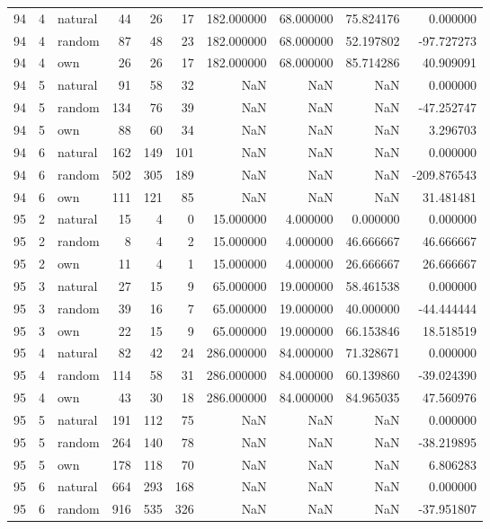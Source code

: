 \begin{table}[htbp]
\begin{tabular}{rrlrrrrrrr}
94 & 4 & natural & 44 & 26 & 17 & 182.000000 & 68.000000 & 75.824176 & 0.000000 \\
94 & 4 & random & 87 & 48 & 23 & 182.000000 & 68.000000 & 52.197802 & -97.727273 \\
94 & 4 & own & 26 & 26 & 17 & 182.000000 & 68.000000 & 85.714286 & 40.909091 \\
94 & 5 & natural & 91 & 58 & 32 & NaN & NaN & NaN & 0.000000 \\
94 & 5 & random & 134 & 76 & 39 & NaN & NaN & NaN & -47.252747 \\
94 & 5 & own & 88 & 60 & 34 & NaN & NaN & NaN & 3.296703 \\
94 & 6 & natural & 162 & 149 & 101 & NaN & NaN & NaN & 0.000000 \\
94 & 6 & random & 502 & 305 & 189 & NaN & NaN & NaN & -209.876543 \\
94 & 6 & own & 111 & 121 & 85 & NaN & NaN & NaN & 31.481481 \\
95 & 2 & natural & 15 & 4 & 0 & 15.000000 & 4.000000 & 0.000000 & 0.000000 \\
95 & 2 & random & 8 & 4 & 2 & 15.000000 & 4.000000 & 46.666667 & 46.666667 \\
95 & 2 & own & 11 & 4 & 1 & 15.000000 & 4.000000 & 26.666667 & 26.666667 \\
95 & 3 & natural & 27 & 15 & 9 & 65.000000 & 19.000000 & 58.461538 & 0.000000 \\
95 & 3 & random & 39 & 16 & 7 & 65.000000 & 19.000000 & 40.000000 & -44.444444 \\
95 & 3 & own & 22 & 15 & 9 & 65.000000 & 19.000000 & 66.153846 & 18.518519 \\
95 & 4 & natural & 82 & 42 & 24 & 286.000000 & 84.000000 & 71.328671 & 0.000000 \\
95 & 4 & random & 114 & 58 & 31 & 286.000000 & 84.000000 & 60.139860 & -39.024390 \\
95 & 4 & own & 43 & 30 & 18 & 286.000000 & 84.000000 & 84.965035 & 47.560976 \\
95 & 5 & natural & 191 & 112 & 75 & NaN & NaN & NaN & 0.000000 \\
95 & 5 & random & 264 & 140 & 78 & NaN & NaN & NaN & -38.219895 \\
95 & 5 & own & 178 & 118 & 70 & NaN & NaN & NaN & 6.806283 \\
95 & 6 & natural & 664 & 293 & 168 & NaN & NaN & NaN & 0.000000 \\
95 & 6 & random & 916 & 535 & 326 & NaN & NaN & NaN & -37.951807 \\

\end{tabular}
\end{table}
